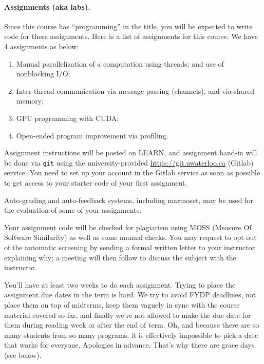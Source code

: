 

\paragraph{Assignments (aka labs).} Since this course has ``programming'' in the 
title, you will be expected to write code for these assignments.  Here
is a list of assignments for this course. We have 4
assignments as below:

\begin{enumerate}
\item Manual parallelization of a computation using threads; and use of nonblocking I/O;
\item Inter-thread communication via message passing (channels), and via shared memory;
\item GPU programming with CUDA;
\item Open-ended program improvement via profiling.
\end{enumerate}
Assignment instructions will be posted on LEARN, and assignment hand-in will be done via \texttt{git} using the university-provided \url{https://git.uwaterloo.ca} (Gitlab) service. You need to set up your account in the Gitlab service as soon as possible to get access to your starter code of your first assignment.

Auto-grading and auto-feedback systems, including marmoset, may be used for the evaluation of some of your assignments.

Your assignment code will be checked for plagiarism using MOSS (Measure Of Software Similarity) as well as some manual checks. You may request to opt out of the automatic screening by sending a formal written letter to your instructor explaining why; a meeting will then follow to discuss the subject with the instructor. 

You'll have at least two weeks to do each assignment. Trying to place the assignment due dates in the term is hard. We try to avoid FYDP deadlines, not place them on top of midterms, keep them vaguely in sync with the course material covered so far, and finally we're not allowed to make the due date for them during reading week or after the end of term. Oh, and because there are so many students from so many programs, it is effectively impossible to pick a date that works for everyone. Apologies in advance. That's why there are grace days (see below).


